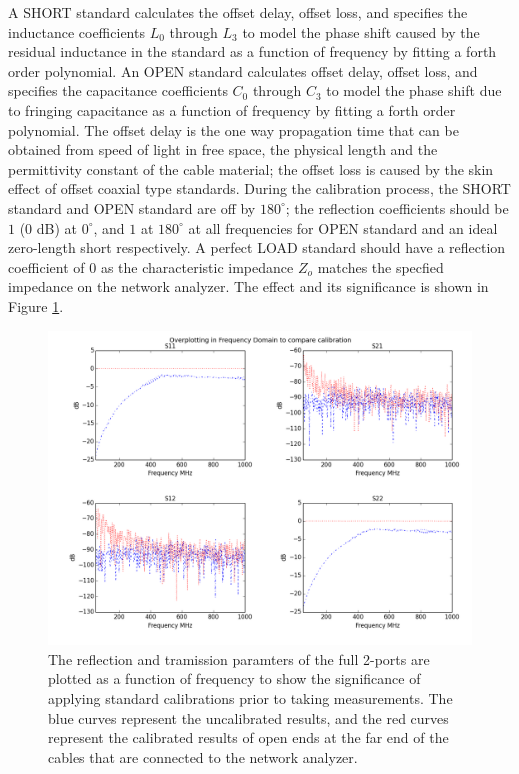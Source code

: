 \documentclass[preprint]{aastex}  %
\begin{document}
A SHORT standard calculates the offset delay, offset loss, and specifies the inductance coefficients $L_0$ through $L_3$ to model the phase shift caused by the residual inductance in the standard as a function of frequency by fitting a forth order polynomial. An OPEN standard calculates offset delay, offset loss, and specifies the capacitance coefficients $C_{0}$ through $C_{3}$ to model the phase shift due to fringing capacitance as a function of frequency by fitting a forth order polynomial. The offset delay is the one way propagation time that can be obtained from speed of light in free space, the physical length and the permittivity constant of the cable material; the offset loss is caused by the skin effect of offset coaxial type standards. During the calibration process, the SHORT standard and OPEN standard are off by $180^\circ$; the reflection coefficients should be $1$ (0 dB) at $0^\circ$, and $1$ at $180^\circ$ at all frequencies for OPEN standard and an ideal zero-length short respectively. A perfect LOAD standard should have a reflection coefficient of $0$ as the characteristic impedance $Z_o$ matches the specfied impedance on the network analyzer. The effect and its significance is shown in Figure \ref{Fig:calibration}. 

\begin{figure}[H]
	\begin{center}
	\includegraphics[width =\textwidth]{./reflectometry_plots/Calibration_open}
	\caption{The reflection and tramission paramters of the full 2-ports are plotted as a function of frequency to show the significance of applying standard calibrations prior to taking measurements. The blue curves represent the uncalibrated results, and the red curves represent the calibrated results of open ends at the far end of the cables that are connected to the network analyzer. }
\label{Fig:calibration} 
	\end{center}
\end{figure}
\clearpage
\end{document}
